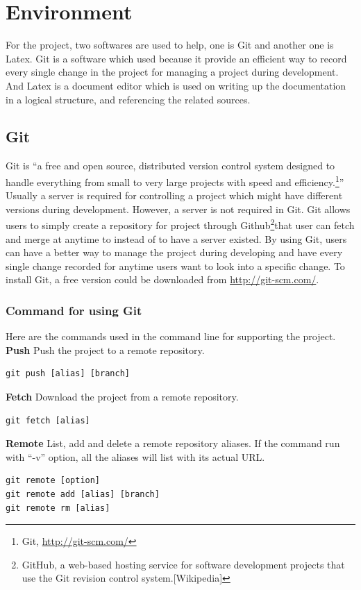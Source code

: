 \documentclass[11pt]{report}
\begin{document}
\chapter{Environment}
\label{cha:Environment}
For the project, two softwares are used to help, one is Git and another one is Latex. Git is a software which used because it provide an efficient way to record every single change in the project for managing a project during development. And Latex is a document editor which is used on writing up the documentation in a logical structure, and referencing the related sources.


\section{Git}
\label{sec:git}
Git is ``a free and open source, distributed version control system designed to handle everything from small to very large projects with speed and efficiency.\footnote{Git, \url{http://git-scm.com/}}'' Usually a server is required for controlling a project which might have different versions during development. However, a server is not required in Git. Git allows users to simply create a repository for project through Github\footnote{GitHub, a web-based hosting service for software development projects that use the Git revision control system.[Wikipedia]}that user can fetch and merge at anytime to instead of to have a server existed. By using Git, users can have a better way to manage the project during developing and have every single change recorded for anytime users want to look into a specific change. To install Git, a free version could be downloaded from \url{http://git-scm.com/}.


\subsection{Command for using Git}
\label{sec:command}
Here are the commands used in the command line for supporting the project.\\

\textbf{Push} Push the project to a remote repository.
\begin{verbatim}
git push [alias] [branch]
\end{verbatim}

\textbf{Fetch} Download the project from a remote repository.
\begin{verbatim}
git fetch [alias]
\end{verbatim}

\textbf{Remote} List, add and delete a remote repository aliases. If the command run with ``-v'' option, all the aliases will list with its actual URL.
\begin{verbatim}
git remote [option]
git remote add [alias] [branch]
git remote rm [alias]
\end{verbatim}
\end{document}
